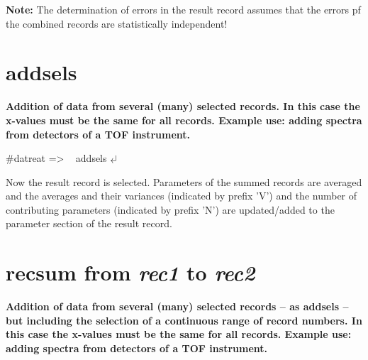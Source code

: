 \documentclass[11pt,fleqn]{book} %
\newcommand{\return}{$\carriagereturn$} %
\newcommand{\sysprompt}{{\color{green}...\textgreater} ~ }
\newcommand{\dtrprompt}{{\color{blue}\#datreat =\textgreater} ~ }
\newcommand{\enter}[1]{{\color{red} \bf #1}}
\newcommand{\var}[1]{{\color{red} \bf \it #1}}
\begin{document}
{\bf Note:}
The determination of errors in the result record assumes that the errors pf the combined records are 
statistically independent!


\section{addsels}
\vskip 1cm


\begin{exercise}
\bf
Addition of data from several (many) selected records. In this case the x-values must be the same
for all records. Example use: adding spectra from detectors of a TOF instrument. 
\end{exercise}

\begin{corollary}
\dtrprompt addsels   \return 
\end{corollary}

Now the result record is selected.
Parameters of the summed records are averaged and the averages and their variances (indicated by prefix 'V') and the
number of contributing parameters (indicated by prefix 'N')  are updated/added to the parameter section
of the result record.



 
\section{recsum from \var{rec1} to \var{rec2}}
\vskip 1cm
\begin{exercise}
\bf
Addition of data from several (many) selected records -- as addsels -- but including the selection of a
continuous range of record numbers. In this case the x-values must be the same
for all records. Example use: adding spectra from detectors of a TOF instrument. 
\end{exercise}
\end{document}
